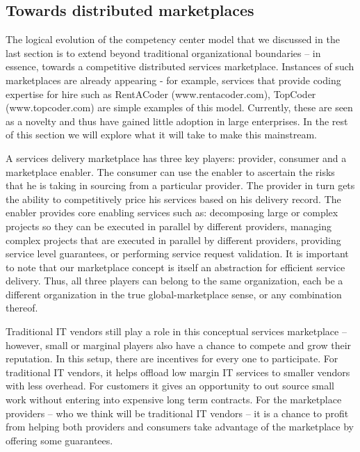 \subsection{Towards distributed marketplaces}

The logical evolution of the competency center model that we discussed in the last section is to extend beyond traditional organizational boundaries -- in essence, towards a competitive distributed services marketplace. Instances of such marketplaces are already appearing - for example, services that provide coding expertise for hire such as RentACoder (www.rentacoder.com), TopCoder (www.topcoder.com) are simple examples of this model. Currently, these are seen as a novelty and thus have gained little adoption in large enterprises. In the rest of this section we will explore what it will take to make this mainstream.

 A services delivery marketplace has three key players: provider, consumer and a marketplace enabler. The consumer can use the enabler to ascertain the risks that he is taking in sourcing from a particular provider. The provider in turn gets the ability to competitively price his services based on his delivery record. The enabler provides core enabling services such as: decomposing large or complex projects so they can be executed in parallel by different providers, managing complex projects that are executed in parallel by different providers, providing service level guarantees, or performing service request validation. It is important to note that our marketplace concept is itself an abstraction for efficient service delivery. Thus, all three players can belong to the same organization, each be a different organization in the true global-marketplace sense, or any combination thereof.

 Traditional IT vendors still play a role in this conceptual services marketplace -- however, small or marginal players also have a chance to compete and grow their reputation. In this setup, there are incentives for every one to participate. For traditional IT vendors, it helps offload low margin IT services to smaller vendors with less overhead. For customers it gives an opportunity to out source small work without entering into expensive long term contracts. For the marketplace providers -- who we think will be traditional IT vendors -- it is a chance to profit from helping both providers and consumers take advantage of the marketplace by offering some guarantees.

